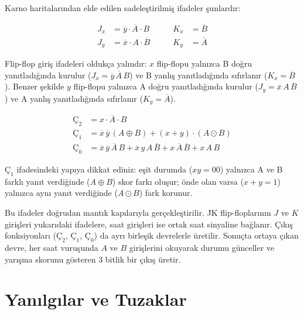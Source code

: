 \begin{ornek}[B.17]
Karno haritalarından elde edilen sadeleştirilmiş ifadeler şunlardır:

\[
\begin{aligned}
J_x &= \overline{y} \cdot \overline{A} \cdot B &\qquad K_x &= \overline{B} \\
J_y &= \overline{x} \cdot A \cdot \overline{B} &\qquad K_y &= \overline{A}
\end{aligned}
\]

Flip-flop giriş ifadeleri oldukça yalındır: $x$ flip-flopu yalnızca B doğru yanıtladığında kurulur ($J_x = \overline{y}\,\overline{A}\,B$) ve B yanlış yanıtladığında sıfırlanır ($K_x = \overline{B}$). Benzer şekilde $y$ flip-flopu yalnızca A doğru yanıtladığında kurulur ($J_y = \overline{x}\,A\,\overline{B}$) ve A yanlış yanıtladığında sıfırlanır ($K_y = \overline{A}$).

\[
\begin{aligned}
\text{Ç}_2 &= x \cdot \overline{A} \cdot B \\
\text{Ç}_1 &= \overline{x}\,\overline{y}\,(A \oplus B) + (x + y) \cdot (A \odot B) \\
\text{Ç}_0 &= \overline{x}\,\overline{y}\,\overline{A}\,B + \overline{x}\,y\,A\,\overline{B} + x\,\overline{A}\,\overline{B} + x\,A\,B
\end{aligned}
\]

$\text{Ç}_1$ ifadesindeki yapıya dikkat ediniz: eşit durumda ($xy{=}00$) yalnızca A ve B farklı yanıt verdiğinde ($A \oplus B$) skor farkı oluşur; önde olan varsa ($x{+}y{=}1$) yalnızca aynı yanıt verdiğinde ($A \odot B$) fark korunur.

Bu ifadeler doğrudan mantık kapılarıyla gerçekleştirilir. JK flip-floplarının $J$ ve $K$ girişleri yukarıdaki ifadelere, saat girişleri ise ortak saat sinyaline bağlanır. Çıkış fonksiyonları ($\text{Ç}_2$, $\text{Ç}_1$, $\text{Ç}_0$) da ayrı birleşik devrelerle üretilir. Sonuçta ortaya çıkan devre, her saat vuruşunda $A$ ve $B$ girişlerini okuyarak durumu günceller ve yarışma skorunu gösteren 3 bitlik bir çıkış üretir.

\end{ornek}


\section{Yanılgılar ve Tuzaklar}
\label{sec:yanilgilar-tuzaklar-sayisal-tasarim}

